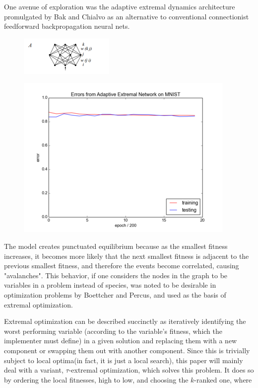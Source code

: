 \documentclass[12pt]{article}
\begin{document}
One avenue of exploration was the adaptive extremal dynamics architecture promulgated by Bak and Chialvo as an alternative to conventional connectionist feedforward backpropagation neural nets. %
\begin{figure}
  \includegraphics{bak_chialvo_net_topology}
\end{figure}
\begin{figure}
  \includegraphics{bak_plot}
\end{figure}

The model creates punctuated equilibrium because as the smallest fitness increases, it becomes more likely that the next smallest fitness is adjacent to the previous smallest fitness, and therefore the events become correlated, causing "avalanches". This behavior, if one considers the nodes in the graph to be variables in a problem instead of species, was noted to be desirable in optimization problems by Boettcher and Percus, and used as the basis of extremal optimization.

Extremal optimization can be described succinctly as iteratively identifying the worst performing variable (according to the variable's fitness, which the implementer must define) in a given solution and replacing them with a new component or swapping them out with another component. Since this is trivially subject to local optima(in fact, it is just a local search), this paper will mainly deal with a variant, $\tau$-extremal optimization, which solves this problem. It does so by ordering the local fitnesses, high to low, and choosing the $k$-ranked one, where
\end{document}
